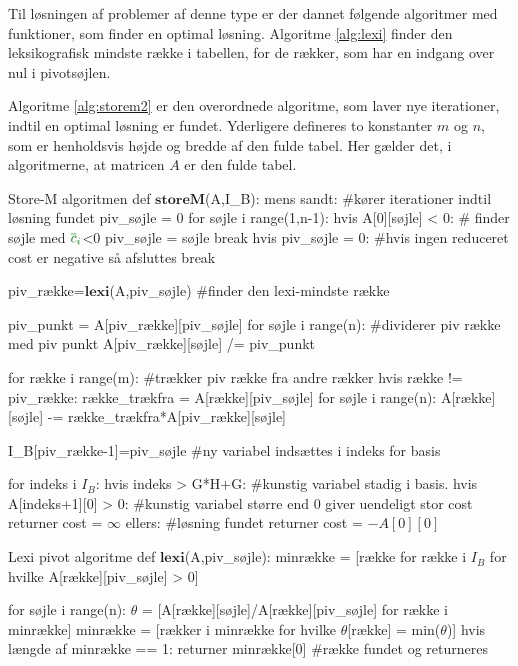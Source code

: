 Til løsningen af problemer af denne type er der dannet følgende algoritmer med funktioner, som finder en optimal løsning. Algoritme \ref{alg:lexi} finder den leksikografisk mindste række i tabellen, for de rækker, som har en indgang over nul i pivotsøjlen. 

Algoritme \ref{alg:storem2} er den overordnede algoritme, som laver nye iterationer, indtil en optimal løsning er fundet. Yderligere defineres to konstanter $m$ og $n$, som er henholdsvis højde og bredde af den fulde tabel. Her gælder det, i algoritmerne, at matricen $A$ er den fulde tabel.

\newpage

\begin{alg}[label={alg:storem2}]{Store-M algoritmen}
def $\textbf{storeM}$(A,I_B):
    mens sandt: #kører iterationer indtil løsning fundet
    	piv_søjle = 0
    	for søjle i range(1,n-1): 
        	hvis A[0][søjle] < 0: # finder søjle med ${\color{commentgreen} \overline{c}_i}$<0
            	piv_søjle = søjle
            	break
		hvis piv_søjle = 0: #hvis ingen reduceret cost er negative så afsluttes
			break
            
    	piv_række=$\textbf{lexi}$(A,piv_søjle) #finder den lexi-mindste række
            
    	piv_punkt = A[piv_række][piv_søjle] 
    	for søjle i range(n): #dividerer piv række med piv punkt
        	A[piv_række][søjle] /= piv_punkt
            
    	for række i range(m): #trækker piv række fra andre rækker
        	hvis række != piv_række:
            	række_trækfra = A[række][piv_søjle]
            	for søjle i range(n):
                	A[række][søjle] -= række_trækfra*A[piv_række][søjle]

    	I_B[piv_række-1]=piv_søjle #ny variabel indsættes i indeks for basis

	for indeks i $I_B$: 
		hvis indeks > G*H+G: #kunstig variabel stadig i basis. 
			hvis A[indeks+1][0] > 0: #kunstig variabel større end 0 giver uendeligt stor cost
				returner cost = $\infty$
	ellers: #løsning fundet
		returner cost = $-A[0][0]$
\end{alg}

\begin{alg}[label={alg:lexi}]{Lexi pivot algoritme}
def $\textbf{lexi}$(A,piv_søjle):
	minrække = [række for række i $I_B$ for hvilke A[række][piv_søjle] > 0]
	
	for søjle i range(n):
		$\theta$ = [A[række][søjle]/A[række][piv_søjle] for række i minrække]
		minrække = [rækker i minrække for hvilke $\theta$[række] = min($\theta$)]
		hvis længde af minrække == 1:
			returner minrække[0] #række fundet og returneres
\end{alg}





